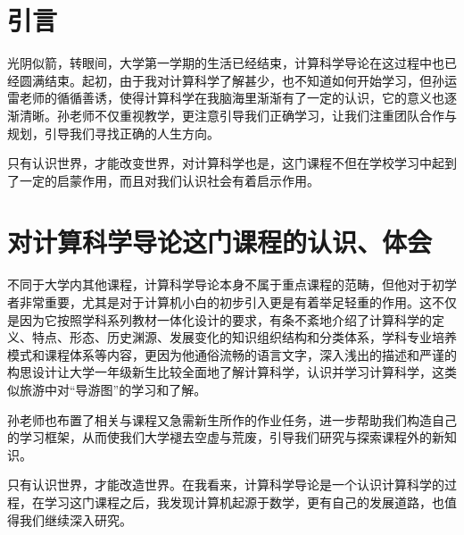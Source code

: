 \documentclass{article}
\begin{document}
\thispagestyle{empty}
\newpage
\setcounter{page}{1}
\section{引言}
光阴似箭，转眼间，大学第一学期的生活已经结束，计算科学导论在这过程中也已经圆满结束。起初，由于我对计算科学了解甚少，也不知道如何开始学习，但孙运雷老师的循循善诱，使得计算科学在我脑海里渐渐有了一定的认识，它的意义也逐渐清晰。孙老师不仅重视教学，更注意引导我们正确学习，让我们注重团队合作与规划，引导我们寻找正确的人生方向。\par
只有认识世界，才能改变世界，对计算科学也是，这门课程不但在学校学习中起到了一定的启蒙作用，而且对我们认识社会有着启示作用。\par


\section{对计算科学导论这门课程的认识、体会}
不同于大学内其他课程，计算科学导论本身不属于重点课程的范畴，但他对于初学者非常重要，尤其是对于计算机小白的初步引入更是有着举足轻重的作用。这不仅是因为它按照学科系列教材一体化设计的要求，有条不紊地介绍了计算科学的定义、特点、形态、历史渊源、发展变化的知识组织结构和分类体系，学科专业培养模式和课程体系等内容，更因为他通俗流畅的语言文字，深入浅出的描述和严谨的构思设计让大学一年级新生比较全面地了解计算科学，认识并学习计算科学，这类似旅游中对“导游图”的学习和了解。\par
孙老师也布置了相关与课程又急需新生所作的作业任务，进一步帮助我们构造自己的学习框架，从而使我们大学褪去空虚与荒废，引导我们研究与探索课程外的新知识。\par
只有认识世界，才能改造世界。在我看来，计算科学导论是一个认识计算科学的过程，在学习这门课程之后，我发现计算机起源于数学，更有自己的发展道路，也值得我们继续深入研究。\par
\end{document}
